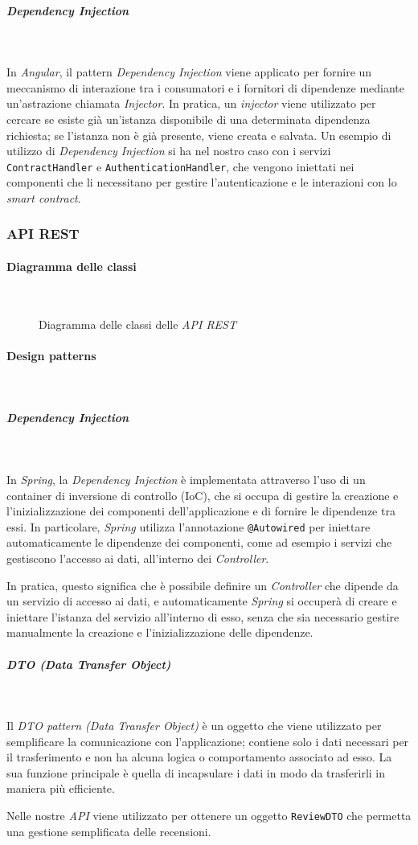 \subparagraph*{Dependency Injection}~

\noindent In \textit{Angular}, il pattern \textit{Dependency Injection} viene applicato per fornire un meccanismo di interazione tra i consumatori e i fornitori di dipendenze mediante un'astrazione chiamata \textit{Injector}. In pratica, un \textit{injector} viene utilizzato per cercare se esiste già un'istanza disponibile di una determinata dipendenza richiesta; se l'istanza non è già presente, viene creata e salvata. Un esempio di utilizzo di \textit{Dependency Injection} si ha nel nostro caso con i servizi \texttt{ContractHandler} e \texttt{AuthenticationHandler}, che vengono iniettati nei componenti che li necessitano per gestire l'autenticazione e le interazioni con lo \textit{smart contract}.

\subsubsection{API REST}
\paragraph{Diagramma delle classi}~
\begin{figure}[H]
    
    \caption{Diagramma delle classi delle \textit{API REST}}\label{fig:apirest}
\end{figure}

\paragraph{Design patterns}~

\subparagraph*{Dependency Injection}~

\noindent In \textit{Spring}, la \textit{Dependency Injection} è implementata attraverso l'uso di un container di inversione di controllo (IoC), che si occupa di gestire la creazione e l'inizializzazione dei componenti dell'applicazione e di fornire le dipendenze tra essi. In particolare, \textit{Spring} utilizza l'annotazione \texttt{@Autowired} per iniettare automaticamente le dipendenze dei componenti, come ad esempio i servizi che gestiscono l'accesso ai dati, all'interno dei \textit{Controller}.

In pratica, questo significa che è possibile definire un \textit{Controller} che dipende da un servizio di accesso ai dati, e automaticamente \textit{Spring} si occuperà di creare e iniettare l'istanza del servizio all'interno di esso, senza che sia necessario gestire manualmente la creazione e l'inizializzazione delle dipendenze.

\subparagraph*{DTO (Data Transfer Object)}~

\noindent Il \textit{DTO pattern (Data Transfer Object)} è un oggetto che viene utilizzato per semplificare la comunicazione con l'applicazione; contiene solo i dati necessari per il trasferimento e non ha alcuna logica o comportamento associato ad esso. La sua funzione principale è quella di incapsulare i dati in modo da trasferirli in maniera più efficiente. 

Nelle nostre \textit{API} viene utilizzato per ottenere un oggetto \texttt{ReviewDTO} che permetta una gestione semplificata delle recensioni.
\pagebreak